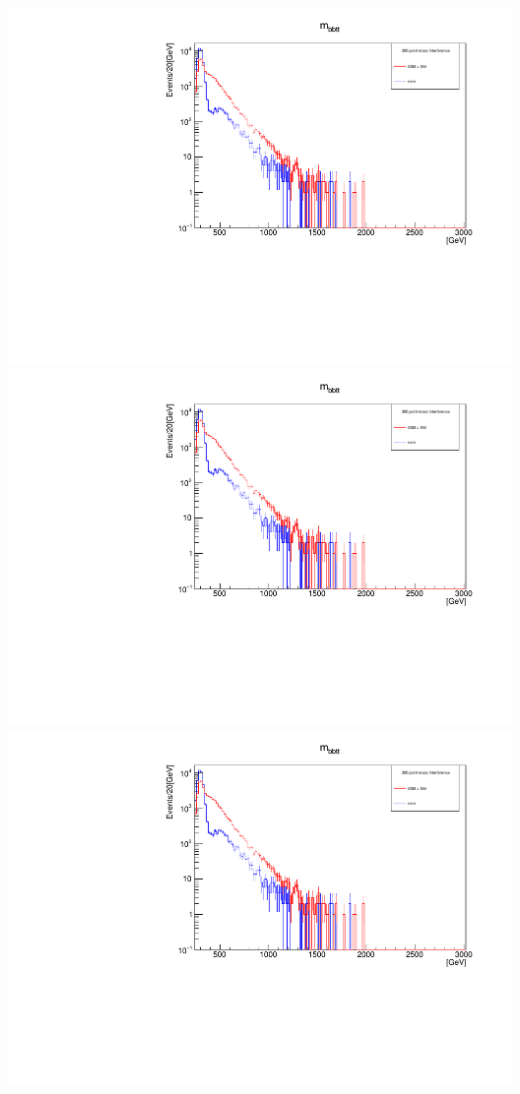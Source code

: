 \documentclass[a4wide,10pt]{article}
\begin{document}
\includegraphics[scale=0.50,page=4]{InterferencePlots10p.pdf}
\includegraphics[scale=0.50,page=5]{InterferencePlots10p.pdf}
\includegraphics[scale=0.50,page=6]{InterferencePlots10p.pdf}
\end{document}
